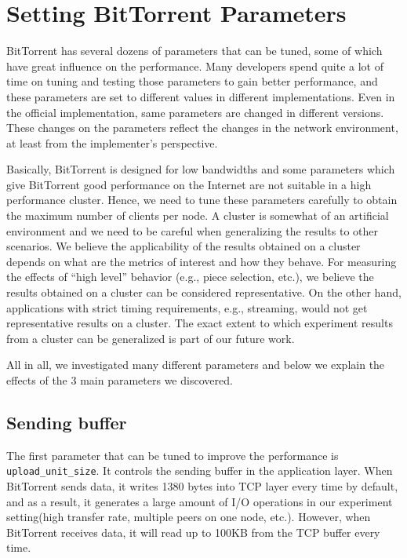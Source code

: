 \documentclass[10pt,letterpaper,twocolumn]{article}
\begin{document}
\section{Setting BitTorrent Parameters}
\label{sec:tune-appl-param}

BitTorrent has several dozens of parameters that can be tuned, some of
which have great influence on the performance. Many developers spend
quite a lot of time on tuning and testing those parameters to gain
better performance, and these parameters are set to different values
in different implementations. Even in the official implementation,
same parameters are changed in different versions.  These changes on
the parameters reflect the changes in the network environment, at
least from the implementer's perspective.

Basically, BitTorrent is designed for low bandwidths and some
parameters which give BitTorrent good performance on the Internet are
not suitable in a high performance cluster. Hence, we need to tune
these parameters carefully to obtain the maximum number of clients per
node. A cluster is somewhat of an artificial environment and we need
to be careful when generalizing the results to other scenarios. We
believe the applicability of the results obtained on a cluster depends
on what are the metrics of interest and how they behave. For measuring
the effects of ``high level'' behavior (e.g., piece selection, etc.),
we believe the results obtained on a cluster can be considered
representative. On the other hand, applications with strict timing
requirements, e.g., streaming, would not get representative results on
a cluster. The exact extent to which experiment results from a cluster
can be generalized is part of our future work.



All in all, we investigated many different parameters and below we
explain the effects of the 3 main parameters we discovered.

\subsection{Sending buffer}
\label{sec:sending-buffer}

The first parameter that can be tuned to improve the performance is
\texttt{upload\_unit\_size}. It controls the sending buffer in the application
layer. When BitTorrent sends data, it writes 1380 bytes into TCP layer
every time by default, and as a result, it generates a large amount of
I/O operations in our experiment setting(high transfer rate, multiple
peers on one node, etc.). However, when BitTorrent receives data, it
will read up to 100KB from the TCP buffer every time.
\end{document}
